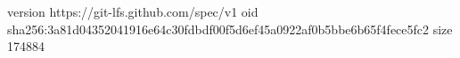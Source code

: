 version https://git-lfs.github.com/spec/v1
oid sha256:3a81d04352041916e64c30fdbdf00f5d6ef45a0922af0b5bbe6b65f4fece5fc2
size 174884
